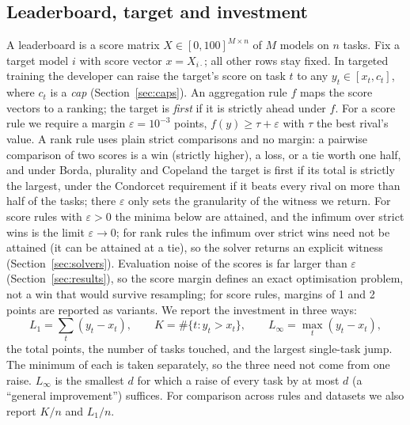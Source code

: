 \documentclass{article}
\begin{document}
\subsection{Leaderboard, target and investment}
A leaderboard is a score matrix $X\in[0,100]^{M\times n}$ of $M$ models on $n$ tasks. Fix a target model $i$ with score vector $x=X_{i\cdot}$; all other rows stay fixed. In targeted training the developer can raise the target's score on task $t$ to any $y_t\in[x_t,c_t]$, where $c_t$ is a \emph{cap} (Section~\ref{sec:caps}). An aggregation rule $f$ maps the score vectors to a ranking; the target is \emph{first} if it is strictly ahead under $f$. For a score rule we require a margin $\varepsilon=10^{-3}$ points, $f(y)\ge\tau+\varepsilon$ with $\tau$ the best rival's value. A rank rule uses plain strict comparisons and no margin: a pairwise comparison of two scores is a win (strictly higher), a loss, or a tie worth one half, and under Borda, plurality and Copeland the target is first if its total is strictly the largest, under the Condorcet requirement if it beats every rival on more than half of the tasks; there $\varepsilon$ only sets the granularity of the witness we return. For score rules with $\varepsilon>0$ the minima below are attained, and the infimum over strict wins is the limit $\varepsilon\to0$; for rank rules the infimum over strict wins need not be attained (it can be attained at a tie), so the solver returns an explicit witness (Section~\ref{sec:solvers}). Evaluation noise of the scores is far larger than $\varepsilon$ (Section~\ref{sec:results}), so the score margin defines an exact optimisation problem, not a win that would survive resampling; for score rules, margins of 1 and 2 points are reported as variants. We report the investment in three ways:
\[
L_1=\sum_t (y_t-x_t),\qquad K=\#\{t: y_t>x_t\},\qquad L_\infty=\max_t (y_t-x_t),
\]
the total points, the number of tasks touched, and the largest single-task jump. The minimum of each is taken separately, so the three need not come from one raise. $L_\infty$ is the smallest $d$ for which a raise of every task by at most $d$ (a ``general improvement'') suffices. For comparison across rules and datasets we also report $K/n$ and $L_1/n$.
\end{document}
